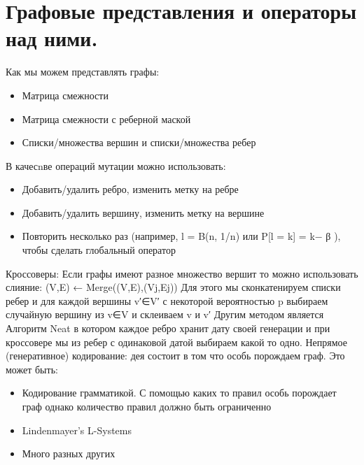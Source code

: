 \section{Графовые представления и операторы над ними.}
Как мы можем представлять графы:
\begin{itemize}
	\item Матрица смежности
	\item Матрица смежности с реберной маской
	\item Списки/множества вершин и списки/множества ребер
\end{itemize}
В качесnве операций мутации можно использовать:
\begin{itemize}
	\item Добавить/удалить ребро, изменить метку на ребре
	\item Добавить/удалить вершину, изменить метку на вершине
	\item Повторить несколько раз (например, l = B(n, 1/n) или P[l = k] = k− β ), чтобы сделать глобальный оператор
\end{itemize}
Кроссоверы:
Если графы имеют разное множество вершит то можно использовать слияние: (V,E) ← Merge((V,E),(Vj,Ej))
Для этого мы сконкатенируем списки ребер и для каждой вершины v′∈V′ с некоторой вероятностью p выбираем случайную вершину из v∈V и склеиваем v и v′
Другим методом является Алгоритм Neat в котором каждое ребро хранит дату своей генерации и при кроссовере мы из ребер с одинаковой датой выбираем какой то одно. 
Непрямое (генеративное) кодирование:
дея состоит в том что особь порождаем граф. Это может быть:
\begin{itemize}
	\item Кодирование грамматикой. С помощью каких то правил особь порождает граф однако количество правил должно быть ограниченно 
	\item Lindenmayer’s L-Systems
	\item Много разных других
\end{itemize}
